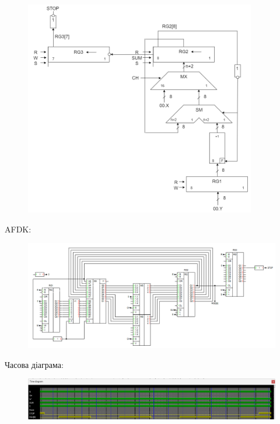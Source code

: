 \documentclass[12pt,a4paper]{article}
\begin{document}
    \begin{figure}[ht]
        \includegraphics[width=0.9\textwidth]{division_function_schemma.png}
    \end{figure}

    \newpage

    AFDK:

    \begin{figure}[ht]
        \includegraphics[width=1.0\textwidth]{schemma3.png}
    \end{figure}

    Часова діаграма:

    \begin{figure}[ht]
        \includegraphics[width=1.0\textwidth]{time3.png}
    \end{figure}
\end{document}
